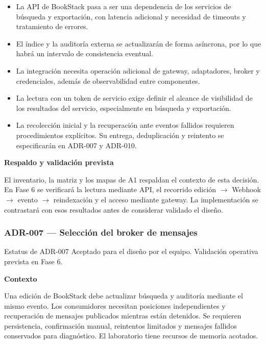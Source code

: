 \begin{itemize}[leftmargin=1.5em,itemsep=3pt]
\item La API de BookStack pasa a ser una dependencia de los servicios de búsqueda y exportación, con latencia adicional y necesidad de timeouts y tratamiento de errores.
\item El índice y la auditoría externa se actualizarán de forma asíncrona, por lo que habrá un intervalo de consistencia eventual.
\item La integración necesita operación adicional de gateway, adaptadores, broker y credenciales, además de observabilidad entre componentes.
\item La lectura con un token de servicio exige definir el alcance de visibilidad de los resultados del servicio, especialmente en búsqueda y exportación.
\item La recolección inicial y la recuperación ante eventos fallidos requieren procedimientos explícitos. Su entrega, deduplicación y reintento se especificarán en ADR-007 y ADR-010.
\end{itemize}

\par\medskip\noindent\textbf{Respaldo y validación prevista}\par\nobreak\smallskip

El inventario, la matriz y los mapas de A1 respaldan el contexto de esta decisión. En Fase 6 se verificará la lectura mediante API, el recorrido edición \ensuremath{\rightarrow} Webhook \ensuremath{\rightarrow} evento \ensuremath{\rightarrow} reindexación y el acceso mediante gateway. La implementación se contrastará con esos resultados antes de considerar validado el diseño.

\clearpage
\subsubsection{ADR-007 — Selección del broker de mensajes}
\label{adr:007}

\begin{adrbox}{Estatus de ADR-007}
Aceptado para el diseño por el equipo. Validación operativa prevista en Fase 6.
\end{adrbox}

\par\medskip\noindent\textbf{Contexto}\par\nobreak\smallskip

Una edición de BookStack debe actualizar búsqueda y auditoría mediante el mismo evento. Los consumidores necesitan posiciones independientes y recuperación de mensajes publicados mientras están detenidos. Se requieren persistencia, confirmación manual, reintentos limitados y mensajes fallidos conservados para diagnóstico. El laboratorio tiene recursos de memoria acotados.

